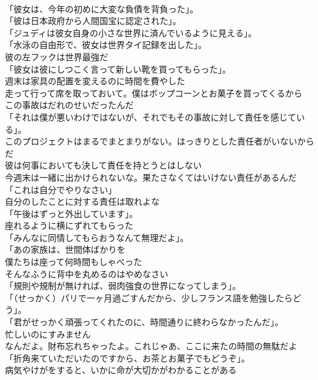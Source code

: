 \documentclass[8pt]{extreport}
\begin{document}
\begin{CJK}{UTF8}{min}
\\	「彼女は、今年の初めに大変な負債を背負った」。	
\\	「彼は日本政府から人間国宝に認定された」。	
\\	「ジュディは彼女自身の小さな世界に済んでいるように見える」。	
\\	「水泳の自由形で、彼女は世界タイ記録を出した」。	
\\	彼の左フックは世界最強だ	
\\	「彼女は彼にしつこく言って新しい靴を買ってもらった」。	
\\	週末は家具の配置を変えるのに時間を費やした	
\\	走って行って席を取っておいて。僕はボップコーンとお菓子を買ってくるから	
\\	この事故はだれのせいだったんだ	
\\	「それは僕が悪いわけではないが、それでもその事故に対して責任を感じている」。	
\\	このプロジェクトはまるでまとまりがない。はっきりとした責任者がいないからだ	
\\	彼は何事においても決して責任を持とうとはしない	
\\	今週末は一緒に出かけられないな。果たさなくてはいけない責任があるんだ	
\\	「これは自分でやりなさい」	
\\	自分のしたことに対する責任は取れよな	
\\	「午後はずっと外出しています」。	
\\	座れるように横にずれてもらった	
\\	「みんなに同情してもらおうなんて無理だよ」。	
\\	「あの家族は、世間体ばかりを	
\\	僕たちは座って何時間もしゃべった	
\\	そんなふうに背中を丸めるのはやめなさい	
\\	「規則や規制が無ければ、弱肉強食の世界になってしまう」。	
\\	「（せっかく）パリで一ヶ月過ごすんだから、少しフランス語を勉強したらどう」。	
\\	「君がせっかく頑張ってくれたのに、時間通りに終わらなかったんだ」。	
\\	忙しいのにすみません	
\\	なんだよ。財布忘れちゃったよ。これじゃあ、ここに来たの時間の無駄だよ	
\\	「折角来ていただいたのですから、お茶とお菓子でもどうぞ」。	
\\	病気やけがをすると、いかに命が大切かがわかることがある	

\end{CJK}
\end{document}
